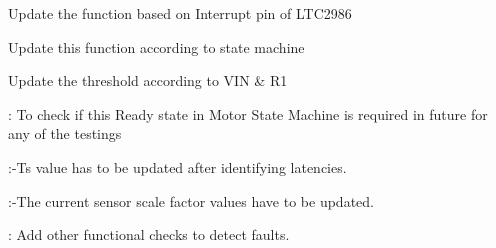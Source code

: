 
\begin{DoxyRefList}
\item[Global \mbox{\hyperlink{group__group1_ga84730584378fdee2a73cabeae52d4379}{ltc\+\_\+get\+\_\+result}} (uint8\+\_\+t channel\+\_\+number, uint8\+\_\+t channel\+\_\+output)]\label{todo__todo000004}%
%
Update the function based on Interrupt pin of LTC2986  
\item[Global \mbox{\hyperlink{group__group1_gaa26f5a25edf4ca557dd24185d913cc0f}{ltc\+\_\+measure\+\_\+channel}} (uint8\+\_\+t channel\+\_\+number, uint8\+\_\+t channel\+\_\+output)]\label{todo__todo000003}%
%
Update this function according to state machine  
\item[Global \mbox{\hyperlink{group__group1_gad1a49a12ac2a47584d08073502f6ac47}{Measure\+\_\+from\+\_\+\+PTC\+\_\+150}} (void)]\label{todo__todo000005}%
%
Update the threshold according to VIN \& R1  
\item[Global \mbox{\hyperlink{group__group3_gaeecdb2045aa23ffbe042d06cf52705c4}{Open\+\_\+\+Loop\+\_\+\+Motor\+State\+MC}} (void)]\label{todo__todo000007}%
%
\+: To check if this Ready state in Motor State Machine is required in future for any of the testings  
\item[Module \mbox{\hyperlink{Drive__Parameters_8h_amgrp7cea831df2d40642e1965eea4a026afe}{SENSOR PARAMETERS}} ]\label{todo__todo000001}%
%
\+:-\/Ts value has to be updated after identifying latencies. 

\label{todo__todo000002}%
%
\+:-\/The current sensor scale factor values have to be updated.  
\item[Global \mbox{\hyperlink{group__group3_gae110c246c0fce9c80c7ad12bc459dc74}{System\+\_\+\+Fault\+Diag}} (void)]\label{todo__todo000006}%
%
\+: Add other functional checks to detect faults. 
\end{DoxyRefList}